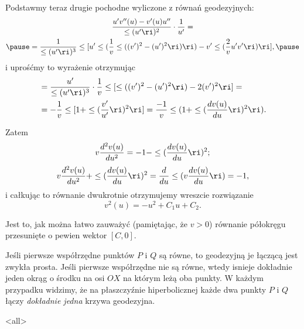 \begin{frame}

Podstawmy teraz drugie pochodne wyliczone z równań geodezyjnych:
\begin{multline*}
\frac{u'v''(u)-v'(u)u''}{\le(u'\ri)^2}\cdot\frac{1}{u'}=\\\pause
=\frac{1}{\le(u'\ri)^3}\le[ u'\le(\frac{1}{v}\le((v')^2-(u')^2\ri)\ri) - v'\le( \frac{2}{v}u'v'\ri)\ri],\pause
\end{multline*}
i uprośćmy to wyrażenie otrzymując
\begin{align*}
&=\frac{u'}{\le(u'\ri)^3}\cdot\frac{1}{v}\le[\le((v')^2-(u')^2\ri)-2(v')^2\ri]=\\
&=-\frac{1}{v}\le[1+\le(\frac{v'}{u'}\ri)^2\ri]=\frac{-1}{v}\le(1+\le(\frac{dv(u)}{du}\ri)^2\ri).
\end{align*}

\end{frame}
\begin{frame}

Zatem \[v\frac{d^2v(u)}{du^2}=-1-\le(\frac{dv(u)}{du}\ri)^2;\]\pause
\[v\frac{d^2v(u)}{du^2}+\le(\frac{dv(u)}{du}\ri)^2=\frac{d}{du}\le(v\frac{dv(u)}{du}\ri)=-1,\]
i całkując to równanie dwukrotnie otrzymujemy wreszcie rozwiązanie
\[v^2(u)=-u^2+C_1u+C_2.\]

\pause Jest to, jak można łatwo zauważyć (pamiętając, że $v>0$) równanie półokręgu przesunięte o pewien wektor $[C,0]$.

\end{frame}
\begin{frame}
\begin{uwaga}
Jeśli pierwsze współrzędne punktów $P$ i $Q$ są równe, to geodezyjną je łączącą jest zwykła prosta. Jeśli pierwsze współrzędne nie są równe, wtedy isnieje dokładnie jeden okrąg o środku na osi $OX$ na którym leżą oba punkty. \pause W każdym przypadku widzimy, że na płaszczyźnie hiperbolicznej każde dwa punkty $P$ i $Q$ łączy \textit{dokładnie jedna} krzywa geodezyjna. 
\end{uwaga}

\end{frame}
\mode<all>{}
